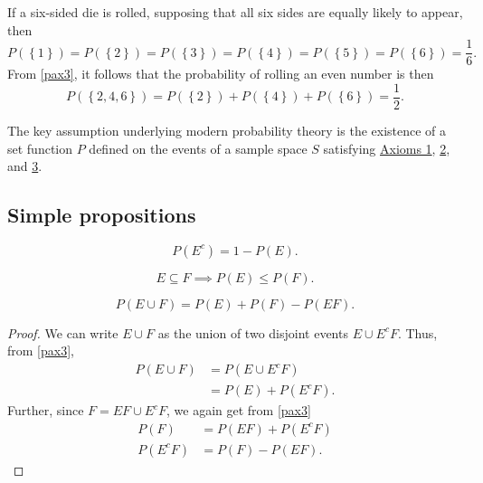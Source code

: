 \begin{changebar}
\begin{example}\label{dieprobex}
    If a six-sided die is rolled, supposing that all six sides are equally likely to appear, then \[
        P(\left\{ 1 \right\}) = P(\left\{ 2 \right\}) = P(\left\{ 3 \right\}) = P(\left\{ 4 \right\}) = P(\left\{ 5 \right\}) = P(\left\{ 6 \right\}) = \frac{1}{6}.    
    \] From \autoref{pax3}, it follows that the probability of rolling an even number is then \[
        P(\left\{ 2, 4, 6 \right\}) = P(\left\{ 2 \right\}) + P(\left\{ 4 \right\}) + P(\left\{ 6 \right\}) = \frac{1}{2}.    
    \]
\end{example}
\end{changebar}

The key assumption underlying modern probability theory is the existence of a set function $P$ defined on the events of a sample space $S$ satisfying \hyperref[pax1]{Axioms 1}, \hyperref[pax2]{2}, and \hyperref[pax3]{3}.

\subsection{Simple propositions}
\begin{proposition}
    \[
        P(E^c) = 1-P(E).
    \]
\end{proposition}
\begin{proposition}
    \[E \subseteq F \implies P(E) \leq P(F).\]
\end{proposition}
\begin{proposition}
    \[
        P(E \cup F) = P(E) + P(F) - P(EF).    
    \]
\end{proposition}
\begin{proof}
    We can write $E \cup F$ as the union of two disjoint events $E \cup E^cF$. Thus, from \autoref{pax3}, \[
        \begin{aligned}
            P(E \cup F) &= P(E \cup E^cF) \\
            &= P(E) + P(E^cF).
        \end{aligned}    
    \] Further, since $F = EF \cup E^cF$, we again get from \autoref{pax3} \[
        \begin{aligned}
            P(F) &= P(EF) + P(E^cF) \\
            P(E^cF) &= P(F) - P(EF).
        \end{aligned}
    \]
\end{proof}

